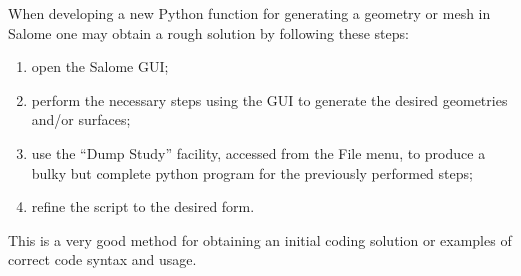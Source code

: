 When developing a new Python function for generating a geometry or mesh in Salome one may obtain a rough solution by following these steps:

\begin{enumerate}
 \item open the Salome GUI;
 \item perform the necessary steps using the GUI to generate the desired geometries and/or surfaces;
 \item use the ``Dump Study'' facility, accessed from the File menu, to produce a bulky but complete python program for the previously performed steps;
 \item refine the script to the desired form.
\end{enumerate}

This is a very good method for obtaining an initial coding solution or examples of correct code syntax and usage.



